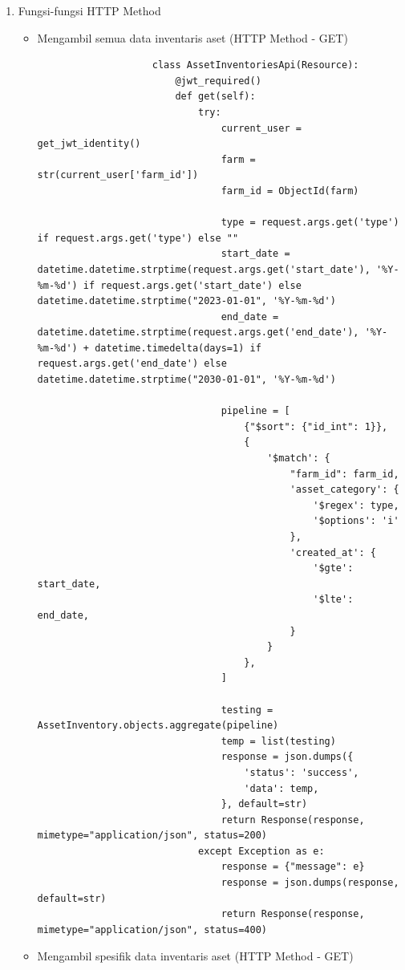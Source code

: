 \begin{spacing}{1.5}
\begin{enumerate}
\begin{enumerate}
\begin{itemize}

				\end{itemize}

			\item Fungsi-fungsi HTTP Method
			
			\begin{itemize}
				\item Mengambil semua data inventaris aset (HTTP Method - GET)
				
				\begin{lstlisting}
					class AssetInventoriesApi(Resource):
						@jwt_required()
						def get(self):
							try:
								current_user = get_jwt_identity()
								farm = str(current_user['farm_id'])
								farm_id = ObjectId(farm)
					
								type = request.args.get('type') if request.args.get('type') else ""
								start_date = datetime.datetime.strptime(request.args.get('start_date'), '%Y-%m-%d') if request.args.get('start_date') else datetime.datetime.strptime("2023-01-01", '%Y-%m-%d')
								end_date = datetime.datetime.strptime(request.args.get('end_date'), '%Y-%m-%d') + datetime.timedelta(days=1) if request.args.get('end_date') else datetime.datetime.strptime("2030-01-01", '%Y-%m-%d')
					
								pipeline = [
									{"$sort": {"id_int": 1}},
									{
										'$match': {
											"farm_id": farm_id,
											'asset_category': {
												'$regex': type,
												'$options': 'i'
											},
											'created_at': {
												'$gte': start_date,
												'$lte': end_date,
											}
										}
									},
								]
							
								testing = AssetInventory.objects.aggregate(pipeline)
								temp = list(testing)
								response = json.dumps({
									'status': 'success',
									'data': temp,
								}, default=str)
								return Response(response, mimetype="application/json", status=200)
							except Exception as e:
								response = {"message": e}
								response = json.dumps(response, default=str)
								return Response(response, mimetype="application/json", status=400)
				\end{lstlisting}

				\item Mengambil spesifik data inventaris aset (HTTP Method - GET)
				

\end{itemize}
\end{enumerate}
\end{enumerate}
\end{spacing}
